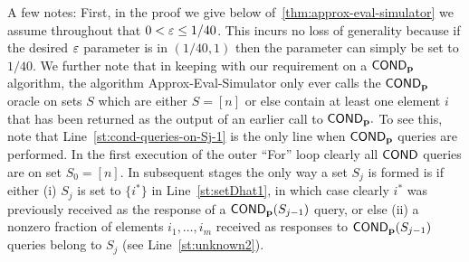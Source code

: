 A few notes:  First, in the proof we give below
of~\cref{thm:approx-eval-simulator} we assume throughout that
$0 < \varepsilon \leq 1/40$. This incurs no loss of generality
because if the desired $\varepsilon$ parameter is in $(1/40,1)$ then the parameter
can simply be set to $1/40$.  We further
note that in keeping with our requirement on a ${\sf COND}_{\mathbf{p}}$ algorithm,
the algorithm {\sc Approx-Eval-Simulator} only ever calls the ${\sf COND}_{\mathbf{p}}$
oracle on sets $S$ which are either $S=[n]$ or else
contain at least one element $i$ that has been returned as the output
of an earlier call to ${\sf COND}_{\mathbf{p}}.$
To see this, note that Line~\ref{st:cond-queries-on-Sj-1}
is the only line when ${\sf COND}_{\mathbf{p}}$ queries are performed.
In the first execution of the outer ``For'' loop clearly
all ${\sf COND}$ queries are on set $S_{0}=[n].$  In subsequent
stages the only way a set $S_j$ is formed is if
either (i) $S_j$ is set to $\{i^\ast\}$ in Line~\ref{st:setDhat1}, in which
case clearly $i^\ast$ was previously received as the response of a ${\sf COND}_{\mathbf{p}}(
S_{j-1})$ query, or else (ii) a nonzero fraction of elements $i_1,\dots,i_m$
received as responses to ${\sf COND}_{\mathbf{p}}(S_{j-1})$ queries belong to
$S_j$ (see Line~\ref{st:unknown2}).

\medskip

